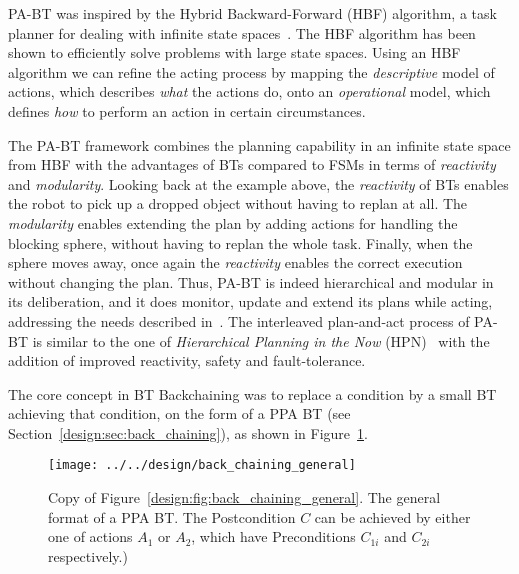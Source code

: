 PA-BT was inspired by the Hybrid Backward-Forward (HBF) algorithm, a task planner for dealing with infinite state spaces~\cite{garrettbackward}. 
The HBF algorithm has been shown  to efficiently solve problems with large state spaces.
Using an HBF algorithm we can
 refine the acting process by mapping the \emph{descriptive} model of actions, which describes \emph{what} the actions do, onto an \emph{operational} model, which defines \emph{how} to perform an action in certain circumstances.



The PA-BT framework combines the planning capability in an infinite state space from HBF
with the advantages of BTs compared to FSMs in terms of \emph{reactivity} and \emph{modularity}.
Looking back at the example above, the \emph{reactivity} of BTs enables the robot to pick up a dropped object without 
having to replan at all. The \emph{modularity} enables extending the plan by adding actions for handling the blocking sphere, without having to
replan the whole task. Finally, when the sphere moves away, once again the \emph{reactivity} enables the correct execution without
changing the plan.
Thus, PA-BT is indeed hierarchical and modular in its deliberation, and it does monitor, update and extend its plans while acting,
addressing the needs described in~\cite{ghallab2016automated, Ghallab14}.
The interleaved plan-and-act process of PA-BT is similar to the one of \emph{Hierarchical Planning in the Now} (HPN)~\cite{kaelbling2011hierarchical} with the addition of improved reactivity, safety and fault-tolerance.



%

The core concept in BT Backchaining was to replace a condition by a small BT achieving that condition,
on the form of a PPA BT (see Section~\ref{design:sec:back_chaining}), as shown in Figure~\ref{planning:fig:back_chaining_general}.

\begin{figure}[h]
\centering
\texttt{[image: ../../design/back\_chaining\_general]}
\caption{Copy of Figure~\ref{design:fig:back_chaining_general}. The general format of a PPA BT. The Postcondition $C$ can be achieved by either one of actions $A_1$ or $A_2$, which have Preconditions $C_{1i}$ and $C_{2i}$ respectively.)}
\label{planning:fig:back_chaining_general}
\end{figure}





